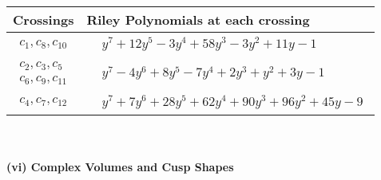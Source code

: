 \documentclass[1p]{elsarticle_modified}
\theoremstyle{definition}
\begin{document}
\begin{tabular}{m{50pt}|m{274pt}}
Crossings & \hspace{64pt}Riley Polynomials at each crossing \\
\hline $$\begin{aligned}c_{1},c_{8},c_{10}\end{aligned}$$&$\begin{aligned}
&y^7+12 y^5-3 y^4+58 y^3-3 y^2+11 y-1
\end{aligned}$\\
\hline $$\begin{aligned}c_{2},c_{3},c_{5}\\c_{6},c_{9},c_{11}\end{aligned}$$&$\begin{aligned}
&y^7-4 y^6+8 y^5-7 y^4+2 y^3+y^2+3 y-1
\end{aligned}$\\
\hline $$\begin{aligned}c_{4},c_{7},c_{12}\end{aligned}$$&$\begin{aligned}
&y^7+7 y^6+28 y^5+62 y^4+90 y^3+96 y^2+45 y-9
\end{aligned}$\\
\hline
\end{tabular}\\~\\
\newpage\flushleft \textbf{(vi) Complex Volumes and Cusp Shapes}
\end{document}
